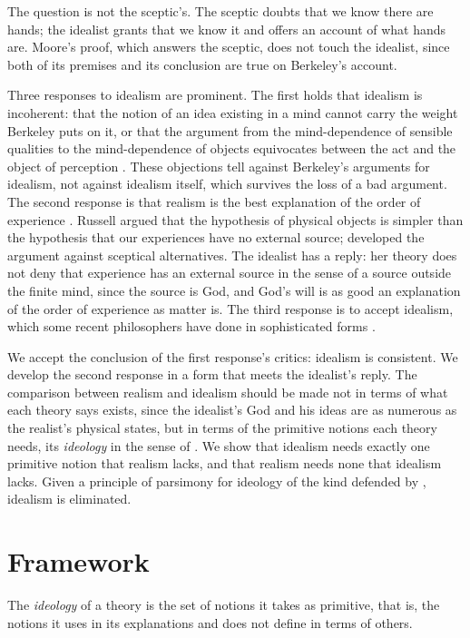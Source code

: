 \documentclass{situationist-preprint}
\begin{document}
The question is not the sceptic's. The sceptic doubts that we know there are hands; the idealist grants that we know it and offers an account of what hands are. Moore's proof, which answers the sceptic, does not touch the idealist, since both of its premises and its conclusion are true on Berkeley's account.

Three responses to idealism are prominent. The first holds that idealism is incoherent: that the notion of an idea existing in a mind cannot carry the weight Berkeley puts on it, or that the argument from the mind-dependence of sensible qualities to the mind-dependence of objects equivocates between the act and the object of perception \citep{Moore1903}. These objections tell against Berkeley's arguments for idealism, not against idealism itself, which survives the loss of a bad argument. The second response is that realism is the best explanation of the order of experience \citep[ch.~2]{Russell1912}. Russell argued that the hypothesis of physical objects is simpler than the hypothesis that our experiences have no external source; \citet{Vogel1990} developed the argument against sceptical alternatives. The idealist has a reply: her theory does not deny that experience has an external source in the sense of a source outside the finite mind, since the source is God, and God's will is as good an explanation of the order of experience as matter is. The third response is to accept idealism, which some recent philosophers have done in sophisticated forms \citep{Foster1982,Foster2008}.

We accept the conclusion of the first response's critics: idealism is consistent. We develop the second response in a form that meets the idealist's reply. The comparison between realism and idealism should be made not in terms of what each theory says exists, since the idealist's God and his ideas are as numerous as the realist's physical states, but in terms of the primitive notions each theory needs, its \emph{ideology} in the sense of \citet{Quine1951}. We show that idealism needs exactly one primitive notion that realism lacks, and that realism needs none that idealism lacks. Given a principle of parsimony for ideology of the kind defended by \citet[\S 7.11]{Sider2011}, idealism is eliminated.

\section{Framework}

\begin{definition}[Ideology]\label{d:ideology}
The \emph{ideology} of a theory is the set of notions it takes as primitive, that is, the notions it uses in its explanations and does not define in terms of others.
\end{definition}
\end{document}
